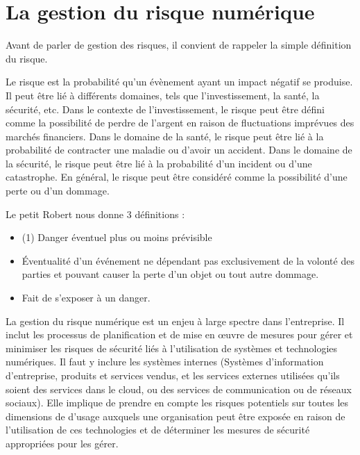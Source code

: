 \section{La gestion du risque numérique}

Avant de parler de gestion des risques, il convient de rappeler la simple définition du risque.

Le risque est la probabilité qu'un évènement ayant un impact négatif se produise. Il peut être lié à différents domaines, tels que l'investissement, la santé, la sécurité, etc. Dans le contexte de l'investissement, le risque peut être défini comme la possibilité de perdre de l'argent en raison de fluctuations imprévues des marchés financiers. Dans le domaine de la santé, le risque peut être lié à la probabilité de contracter une maladie ou d'avoir un accident. Dans le domaine de la sécurité, le risque peut être lié à la probabilité d'un incident ou d'une catastrophe. En général, le risque peut être considéré comme la possibilité d'une perte ou d'un dommage.

Le petit Robert nous donne 3 définitions :
\begin{itemize}
  \item (1) Danger éventuel plus ou moins prévisible
  \item Éventualité d’un événement ne dépendant pas exclusivement de la volonté des parties et pouvant causer la perte d’un objet ou tout autre dommage.
  \item Fait de s’exposer à un danger.
\end{itemize}



La gestion du risque numérique est un enjeu à large spectre dans l'entreprise. Il inclut les processus de planification et de mise en œuvre de mesures pour gérer et minimiser les risques de sécurité liés à l'utilisation de systèmes et technologies numériques. Il faut y inclure les systèmes internes (Systèmes d'information d'entreprise, produits et services vendus, et les services externes utilisées qu'ils soient des services dans le cloud, ou des services de communication ou de réseaux sociaux).
Elle implique de prendre en compte les risques potentiels sur toutes les dimensions de d'usage auxquels une organisation peut être exposée en raison de l'utilisation de ces technologies  et de déterminer les mesures de sécurité appropriées pour les gérer.

